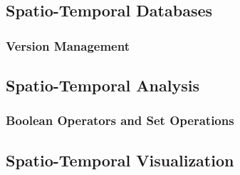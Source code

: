 





\subsection{Spatio-Temporal Databases} %
\label{sub:spatio_temporal_databases}

\subsubsection{Version Management} %
\label{ssub:version_management}





\subsection{Spatio-Temporal Analysis} %
\label{sub:spatio_temporal_analysis}

\subsubsection{Boolean Operators and Set Operations} %
\label{ssub:boolean_operators_and_set_operations}






\subsection{Spatio-Temporal Visualization} %
\label{sub:spatio_temporal_visualization}




